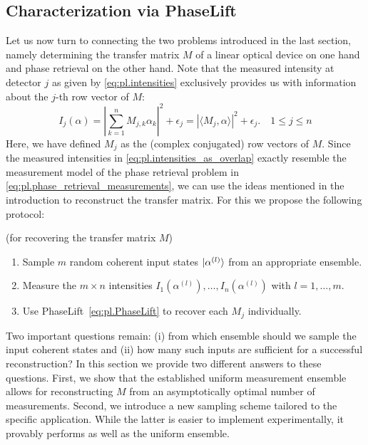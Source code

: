 \subsection{Characterization via PhaseLift}

Let us now turn to connecting the two problems introduced in the last section, namely determining the transfer matrix ${M}$ of a linear optical device on one hand and phase retrieval on the other hand.
Note that the measured intensity at detector $j$ as given by \cref{eq:pl.intensities} exclusively provides us with information about the $j$-th row vector of ${M}$:
\[
  I_j({\alpha})
  = \left| \sum_{k=1}^n M_{j,k} \alpha_k \right|^2 + \epsilon_j
  = \left\vert  \langle {M}_j, \alpha \rangle  \right\vert^2 + \epsilon_j. \quad 1 \leq j \leq n
  \label{eq:pl.intensities_as_overlap}
\]
Here, we have defined ${M}_j$ as the (complex conjugated) row vectors of ${M}$.
Since the measured intensities in \cref{eq:pl.intensities_as_overlap} exactly resemble the measurement model of the phase retrieval problem in \cref{eq:pl.phase_retrieval_measurements}, we can use the ideas mentioned in the introduction to reconstruct the transfer matrix.
For this we propose the following protocol:
\begin{protocol}{(for recovering the transfer matrix $ M$)}%
  \label{prot:characterization}
  \begin{enumerate}
    \item Sample $m$ random coherent input states $\ket{ \alpha^{(l)}}$ from an appropriate ensemble.
    \item Measure the $m \times n$ intensities $I_1(\alpha^{(l)}), \ldots, I_n ( \alpha^{(l)})$ with $l=1,\ldots,m$.
    \item Use PhaseLift~\eqref{eq:pl.PhaseLift} to recover each ${M}_j$ individually.
  \end{enumerate}
\end{protocol}
Two important questions remain:
(i) from which ensemble should we sample the input coherent states and (ii) how many such inputs are sufficient for a successful reconstruction?
In this section we provide two different answers to these questions.
First, we show that the established uniform measurement ensemble~\cite{Kueng_2014_Low} allows for reconstructing $ M$ from an asymptotically optimal number of measurements.
Second, we introduce a new sampling scheme tailored to the specific application.
While the latter is easier to implement experimentally, it provably performs as well as the uniform ensemble.\\


